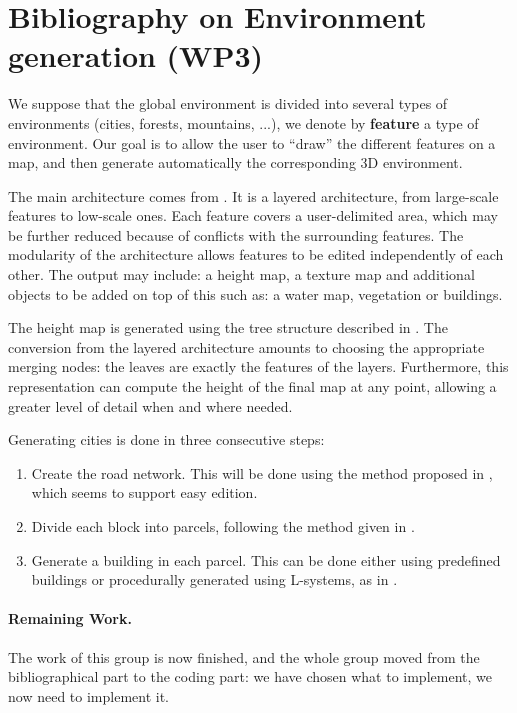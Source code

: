 \section{Bibliography on Environment generation (WP3)}
\label{WP3}


We suppose that the global environment is divided into several types of environments (cities, forests, mountains, ...), we denote by \textbf{feature} a type of environment. Our goal is to allow the user to ``draw'' the different features on a map, and then generate automatically the corresponding 3D environment.

The main architecture comes from \cite{DeclarativeArchitecture}. It is a layered architecture, from large-scale features to low-scale ones. Each feature covers a user-delimited area, which may be further reduced because of conflicts with the surrounding features. The modularity of the architecture allows features to be edited independently of each other. The output may include: a height map, a texture map and additional objects to be added on top of this such as: a water map, vegetation or buildings.

The height map is generated using the tree structure described in \cite{FeatureTree}. The conversion from the layered architecture amounts to choosing the appropriate merging nodes: the leaves are exactly the features of the layers. Furthermore, this representation can compute the height of the final map at any point, allowing a greater level of detail when and where needed.

Generating cities is done in three consecutive steps:
\begin{enumerate}
\item Create the road network. This will be done using the method proposed in \cite{StreetTensors}, which seems to support easy edition.
  
\item Divide each block into parcels, following the method given in \cite{PGParcels}.
  
\item Generate a building in each parcel. This can be done either using predefined buildings or procedurally generated using L-systems, as in \cite{FLSystem}.
\end{enumerate}


\paragraph{Remaining Work.} The work of this group is now finished, and the whole group moved from the bibliographical part to the coding part: we have chosen what to implement, we now need to implement it.
